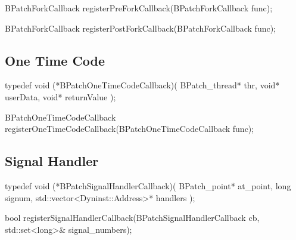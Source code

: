 \begin{apient}
  BPatchForkCallback registerPreForkCallback(BPatchForkCallback func);
\end{apient}


\begin{apient}
  BPatchForkCallback registerPostForkCallback(BPatchForkCallback func);
\end{apient}


\subsection{One Time Code}

\begin{apient}
  typedef void (*BPatchOneTimeCodeCallback)(
    BPatch_thread* thr,
    void* userData,
    void* returnValue
  );
\end{apient}

\begin{apient}
  BPatchOneTimeCodeCallback registerOneTimeCodeCallback(BPatchOneTimeCodeCallback func);
\end{apient}


\subsection{Signal Handler}

\begin{apient}
  typedef void (*BPatchSignalHandlerCallback)(
    BPatch_point* at_point,
    long signum,
    std::vector<Dyninst::Address>* handlers
  );
\end{apient}

\begin{apient}
  bool registerSignalHandlerCallback(BPatchSignalHandlerCallback cb,
                                     std::set<long>& signal_numbers);
\end{apient}

